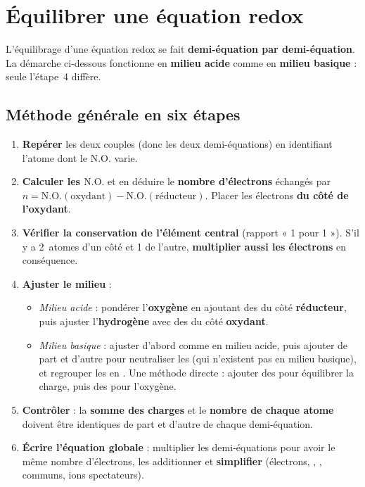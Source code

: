 \documentclass[11pt,a4paper]{article}
\newcommand{\NO}{\ensuremath{\mathrm{N.O.}}}    %
\begin{document}
\section{Équilibrer une équation redox}

L'équilibrage d'une équation redox se fait \textbf{demi-équation par demi-équation}. La démarche
ci-dessous fonctionne en \textbf{milieu acide} comme en \textbf{milieu basique} : seule l'étape~4
diffère.

\subsection{Méthode générale en six étapes}

\begin{methode}
\begin{enumerate}[label=\textbf{\arabic*.},leftmargin=2.2em,topsep=2pt,itemsep=3pt]
  \item \textbf{Repérer} les deux couples (donc les deux demi-équations) en identifiant l'atome
        dont le $\NO$ varie.
  \item \textbf{Calculer les $\NO$} et en déduire le \textbf{nombre d'électrons} échangés par
        $n=\NO(\text{oxydant})-\NO(\text{réducteur})$. Placer les électrons \textbf{du côté de
        l'oxydant}.
  \item \textbf{Vérifier la conservation de l'élément central} (rapport « 1 pour 1 »). S'il y a
        2~atomes d'un côté et 1 de l'autre, \textbf{multiplier aussi les électrons} en conséquence.
  \item \textbf{Ajuster le milieu} :
        \begin{itemize}[leftmargin=1.2em,topsep=1pt,itemsep=1pt]
          \item \emph{Milieu acide} : pondérer l'\textbf{oxygène} en ajoutant des  du côté
                \textbf{réducteur}, puis ajuster l'\textbf{hydrogène} avec des  du côté
                \textbf{oxydant}.
          \item \emph{Milieu basique} : ajuster d'abord comme en milieu acide, puis ajouter
                 de part et d'autre pour neutraliser les  (qui n'existent pas en
                milieu basique), et regrouper les  en . Une méthode directe :
                ajouter des  pour équilibrer la charge, puis des  pour l'oxygène.
        \end{itemize}
  \item \textbf{Contrôler} : la \textbf{somme des charges} et le \textbf{nombre de chaque atome}
        doivent être identiques de part et d'autre de chaque demi-équation.
  \item \textbf{Écrire l'équation globale} : multiplier les demi-équations pour avoir le même nombre
        d'électrons, les additionner et \textbf{simplifier} (électrons, , ,
         communs, ions spectateurs).
\end{enumerate}
\end{methode}
\end{document}
